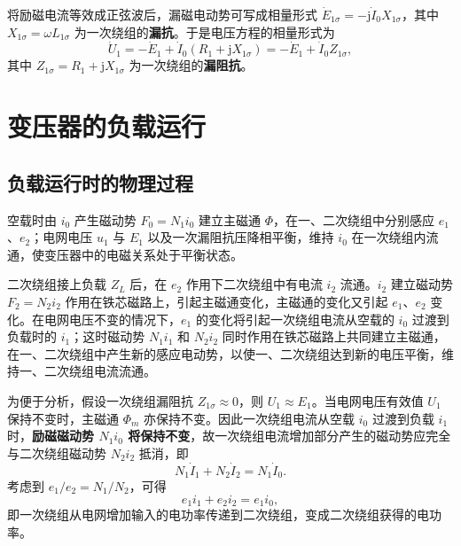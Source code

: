 将励磁电流等效成正弦波后，漏磁电动势可写成相量形式 $\dot E_{1\sigma}=-\mathrm{j}\dot I_0X_{1\sigma}$，其中 $X_{1\sigma}=\omega L_{1\sigma}$ 为一次绕组的\textbf{漏抗}。于是电压方程的相量形式为
\begin{equation}
\dot U_1=-\dot E_1+\dot I_0\left(R_1+\mathrm{j}X_{1\sigma}\right)=-\dot E_1+\dot I_0Z_{1\sigma},
\end{equation}
其中 $Z_{1\sigma}=R_1+\mathrm{j}X_{1\sigma}$ 为一次绕组的\textbf{漏阻抗}。


\section{变压器的负载运行}

\subsection{负载运行时的物理过程}
空载时由 $i_0$ 产生磁动势 $F_0=N_1i_0$ 建立主磁通 $\Phi$，在一、二次绕组中分别感应 $e_1$、$e_2$；电网电压 $u_1$ 与 $E_1$ 以及一次漏阻抗压降相平衡，维持 $i_0$ 在一次绕组内流通，使变压器中的电磁关系处于平衡状态。

二次绕组接上负载 $Z_L$ 后，在 $e_2$ 作用下二次绕组中有电流 $i_2$ 流通。$i_2$ 建立磁动势 $F_2=N_2i_2$ 作用在铁芯磁路上，引起主磁通变化，主磁通的变化又引起 $e_1$、$e_2$ 变化。在电网电压不变的情况下，$e_1$ 的变化将引起一次绕组电流从空载的 $i_0$ 过渡到负载时的 $i_1$；这时磁动势 $N_1i_1$ 和 $N_2i_2$ 同时作用在铁芯磁路上共同建立主磁通，在一、二次绕组中产生新的感应电动势，以使一、二次绕组达到新的电压平衡，维持一、二次绕组电流流通。

为便于分析，假设一次绕组漏阻抗 $Z_{1\sigma}\approx0$，则 $U_1\approx E_1$。当电网电压有效值 $U_1$ 保持不变时，主磁通 $\Phi_m$ 亦保持不变。因此一次绕组电流从空载 $i_0$ 过渡到负载 $i_1$ 时，\textbf{励磁磁动势 $N_1i_0$ 将保持不变}，故一次绕组电流增加部分产生的磁动势应完全与二次绕组磁动势 $N_2i_2$ 抵消，即
\begin{equation}
N_1\dot I_1+N_2\dot I_2=N_1\dot I_0 .
\end{equation}
考虑到 $e_1/e_2=N_1/N_2$，可得
\begin{equation}
e_1i_1+e_2i_2=e_1i_0,
\end{equation}
即一次绕组从电网增加输入的电功率传递到二次绕组，变成二次绕组获得的电功率。


